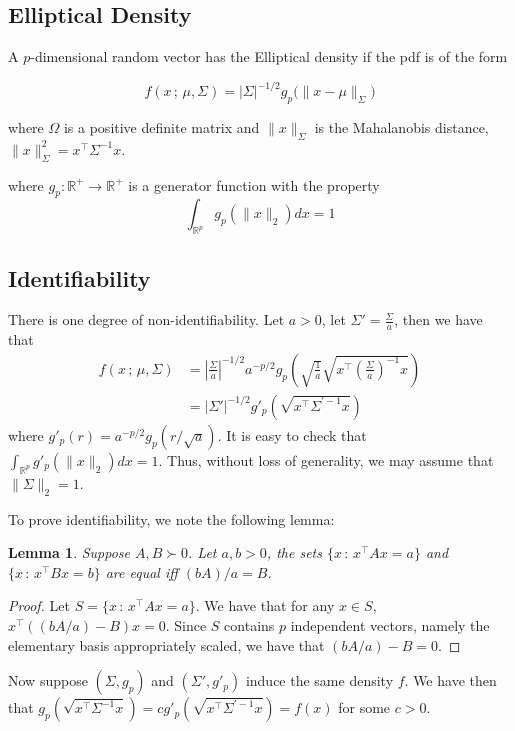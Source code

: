 \documentclass[12pt]{article}
\newtheorem{lemma}[theorem]{Lemma}
\begin{document}
\subsection{Elliptical Density}

A $p$-dimensional random vector has the Elliptical density if the pdf is of the form

\[
f(x \,;\, \mu, \Sigma) = | \Sigma |^{- 1/2} g_p \big( \| x - \mu \|_{\Sigma}  \big)
\]

where $\Omega$ is a positive definite matrix and $\| x \|_{\Sigma}$ is the Mahalanobis distance, $\| x \|^2_{\Sigma} = x^\top \Sigma^{-1} x$. 

where $g_p : \mathbb{R}^+ \rightarrow \mathbb{R}^+$ is a generator function with the property
\[
\int_{\mathbb{R}^p} g_p( \| x \|_2 ) dx = 1
\]

\subsection{Identifiability}
There is one degree of non-identifiability. Let $a > 0$, let $\Sigma' = \frac{\Sigma}{a}$, then we have that
\begin{align*}
 f(x \,;\, \mu, \Sigma) &= \left| \frac{\Sigma}{a} \right|^{-1/2} a^{-p/2} g_p\left(
         \sqrt{\frac{1}{a} } \sqrt{x^\top \left( \frac{\Sigma}{a} \right)^{-1} x } \right) \\
   &= | \Sigma' |^{-1/2} g'_p( \sqrt{ x^\top \Sigma^{\prime -1} x } ) 
\end{align*}
where $g'_p(r) = a^{-p/2} g_p( r/\sqrt{a} )$. It is easy to check that $\int_{\mathbb{R}^p} g'_p( \| x \|_2 ) dx = 1$. Thus, without loss of generality, we may assume that $\| \Sigma \|_2 = 1$.

To prove identifiability, we note the following lemma:
\begin{lemma}
Suppose $A, B \succ 0$. Let $a, b >0$, the sets $\{ x \,:\, x^\top A x = a \}$ and $\{ x \,:\, x^\top B x = b \}$ are equal iff $ (bA)/a = B$. 
\end{lemma}

\begin{proof}
Let $S = \{ x \,:\, x^\top A x = a\}$. We have that for any $x \in S$, $x^\top ( (bA/a) - B) x = 0$. Since $S$ contains $p$ independent vectors, namely the elementary basis appropriately scaled, we have that $(bA/a) - B = 0$. 
\end{proof}

Now suppose $(\Sigma, g_p)$ and $(\Sigma', g'_p)$ induce the same density $f$. We have then that $g_p( \sqrt{x^\top \Sigma^{-1} x} ) = c g'_p( \sqrt{ x^\top \Sigma^{\prime -1} x } ) = f(x)$ for some $c > 0$.\\
\end{document}
